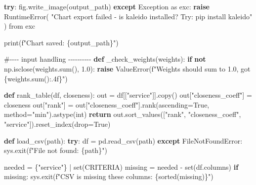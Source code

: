 \documentclass[
  12pt,
  letterpaper,
  12pt,
  oneside,
  english,
  onehalfspacing,
  headsepline]{MastersDoctoralThesis}
\newenvironment{Shaded}{\begin{snugshade}}{\end{snugshade}}
\newcommand{\BuiltInTok}[1]{\textcolor[rgb]{0.00,0.23,0.31}{#1}}
\newcommand{\CommentTok}[1]{\textcolor[rgb]{0.37,0.37,0.37}{#1}}
\newcommand{\ControlFlowTok}[1]{\textcolor[rgb]{0.00,0.23,0.31}{\textbf{#1}}}
\newcommand{\FloatTok}[1]{\textcolor[rgb]{0.68,0.00,0.00}{#1}}
\newcommand{\ImportTok}[1]{\textcolor[rgb]{0.00,0.46,0.62}{#1}}
\newcommand{\KeywordTok}[1]{\textcolor[rgb]{0.00,0.23,0.31}{\textbf{#1}}}
\newcommand{\NormalTok}[1]{\textcolor[rgb]{0.00,0.23,0.31}{#1}}
\newcommand{\OperatorTok}[1]{\textcolor[rgb]{0.37,0.37,0.37}{#1}}
\newcommand{\PreprocessorTok}[1]{\textcolor[rgb]{0.68,0.00,0.00}{#1}}
\newcommand{\SpecialCharTok}[1]{\textcolor[rgb]{0.37,0.37,0.37}{#1}}
\newcommand{\SpecialStringTok}[1]{\textcolor[rgb]{0.13,0.47,0.30}{#1}}
\newcommand{\StringTok}[1]{\textcolor[rgb]{0.13,0.47,0.30}{#1}}
\newcommand{\VariableTok}[1]{\textcolor[rgb]{0.07,0.07,0.07}{#1}}
\begin{document}
\begin{Shaded}
\begin{Highlighting}[]
    \ControlFlowTok{try}\NormalTok{:}
\NormalTok{        fig.write\_image(output\_path)}
    \ControlFlowTok{except} \PreprocessorTok{Exception} \ImportTok{as}\NormalTok{ exc:}
        \ControlFlowTok{raise} \PreprocessorTok{RuntimeError}\NormalTok{(}
            \StringTok{"Chart export failed {-} is kaleido installed? Try: pip install kaleido"}
\NormalTok{        ) }\ImportTok{from}\NormalTok{ exc}

    \BuiltInTok{print}\NormalTok{(}\SpecialStringTok{f"Chart saved: }\SpecialCharTok{\{}\NormalTok{output\_path}\SpecialCharTok{\}}\SpecialStringTok{"}\NormalTok{)}


\CommentTok{\#{-}{-}{-}{-} input handling {-}{-}{-}{-}{-}{-}{-}{-}{-}{-}}
\KeywordTok{def}\NormalTok{ \_check\_weights(weights):}
    \ControlFlowTok{if} \KeywordTok{not}\NormalTok{ np.isclose(weights.}\BuiltInTok{sum}\NormalTok{(), }\FloatTok{1.0}\NormalTok{):}
        \ControlFlowTok{raise} \PreprocessorTok{ValueError}\NormalTok{(}\SpecialStringTok{f"Weights should sum to 1.0, got }\SpecialCharTok{\{}\NormalTok{weights}\SpecialCharTok{.}\BuiltInTok{sum}\NormalTok{()}\SpecialCharTok{:.4f\}}\SpecialStringTok{"}\NormalTok{)}

\KeywordTok{def}\NormalTok{ rank\_table(df, closeness):}
\NormalTok{    out }\OperatorTok{=}\NormalTok{ df[[}\StringTok{"service"}\NormalTok{]].copy()}
\NormalTok{    out[}\StringTok{"closeness\_coeff"}\NormalTok{] }\OperatorTok{=}\NormalTok{ closeness}
\NormalTok{    out[}\StringTok{"rank"}\NormalTok{] }\OperatorTok{=}\NormalTok{ out[}\StringTok{"closeness\_coeff"}\NormalTok{].rank(ascending}\OperatorTok{=}\VariableTok{True}\NormalTok{, method}\OperatorTok{=}\StringTok{"min"}\NormalTok{).astype(}\BuiltInTok{int}\NormalTok{)}
    \ControlFlowTok{return}\NormalTok{ out.sort\_values([}\StringTok{"rank"}\NormalTok{, }\StringTok{"closeness\_coeff"}\NormalTok{, }\StringTok{"service"}\NormalTok{]).reset\_index(drop}\OperatorTok{=}\VariableTok{True}\NormalTok{)}

\KeywordTok{def}\NormalTok{ load\_csv(path):}
    \ControlFlowTok{try}\NormalTok{:}
\NormalTok{        df }\OperatorTok{=}\NormalTok{ pd.read\_csv(path)}
    \ControlFlowTok{except} \PreprocessorTok{FileNotFoundError}\NormalTok{:}
\NormalTok{        sys.exit(}\SpecialStringTok{f"File not found: }\SpecialCharTok{\{}\NormalTok{path}\SpecialCharTok{\}}\SpecialStringTok{"}\NormalTok{)}

\NormalTok{    needed }\OperatorTok{=}\NormalTok{ \{}\StringTok{"service"}\NormalTok{\} }\OperatorTok{|} \BuiltInTok{set}\NormalTok{(CRITERIA)}
\NormalTok{    missing }\OperatorTok{=}\NormalTok{ needed }\OperatorTok{{-}} \BuiltInTok{set}\NormalTok{(df.columns)}
    \ControlFlowTok{if}\NormalTok{ missing:}
\NormalTok{        sys.exit(}\SpecialStringTok{f"CSV is missing these columns: }\SpecialCharTok{\{}\BuiltInTok{sorted}\NormalTok{(missing)}\SpecialCharTok{\}}\SpecialStringTok{"}\NormalTok{)}


\end{Highlighting}
\end{Shaded}
\end{document}
